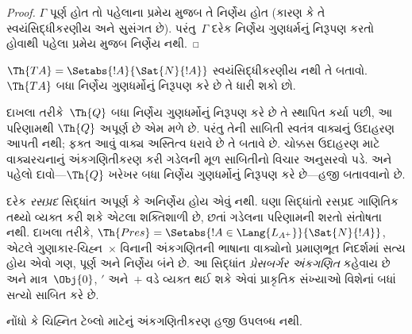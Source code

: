 \begin{proof}
$\Gamma$ પૂર્ણ હોત તો
પહેલાના પ્રમેય મુજબ તે નિર્ણેય
હોત (કારણ કે તે સ્વયંસિદ્ધીકરણીય
અને સુસંગત છે). પરંતુ~$\Gamma$
દરેક નિર્ણેય ગુણધર્મનું
નિરૂપણ કરતો હોવાથી પહેલા
પ્રમેય મુજબ નિર્ણેય નથી.
\end{proof}

\begin{prob}
$\Th{TA} = \Setabs{!A}{\Sat{N}{!A}}$
સ્વયંસિદ્ધીકરણીય નથી તે બતાવો.
$\Th{TA}$ બધા નિર્ણેય ગુણધર્મોનું
નિરૂપણ કરે છે તે ધારી શકો છો.
\end{prob}

દાખલા તરીકે~$\Th{Q}$ બધા
નિર્ણેય ગુણધર્મોનું નિરૂપણ
કરે છે તે સ્થાપિત કર્યા પછી, આ પરિણામથી
$\Th{Q}$ અપૂર્ણ છે એમ મળે છે. પરંતુ તેની
સાબિતી સ્વતંત્ર વાક્યનું ઉદાહરણ
આપતી નથી; ફક્ત આવું વાક્ય
અસ્તિત્વ ધરાવે છે તે બતાવે છે. ચોક્કસ
ઉદાહરણ માટે વાક્યરચનાનું અંકગણિતીકરણ
કરી ગડેલની મૂળ સાબિતીનો વિચાર અનુસરવો
પડે. અને પહેલો દાવો—$\Th{Q}$ ખરેખર
બધા નિર્ણેય ગુણધર્મોનું
નિરૂપણ કરે છે—હજી બતાવવાનો છે.

દરેક \emph{રસપ્રદ} સિદ્ધાંત અપૂર્ણ કે
અનિર્ણેય હોય એવું નથી. ઘણા સિદ્ધાંતો
રસપ્રદ ગાણિતિક તથ્યો વ્યક્ત કરી શકે
એટલા શક્તિશાળી છે, છતાં ગડેલના પરિણામની
શરતો સંતોષતા નથી. દાખલા તરીકે,
$\Th{Pres} = \Setabs{!A \in \Lang{L_{A^+}}}{\Sat{N}{!A}}$,
એટલે ગુણાકાર-ચિહ્ન~$\times$ વિનાની
અંકગણિતની ભાષાના વાક્યોનો
પ્રમાણભૂત નિદર્શમાં સત્ય હોય એવો ગણ,
પૂર્ણ અને નિર્ણેય બંને છે. આ સિદ્ધાંત
\emph{પ્રેસબર્ગર અંકગણિત} કહેવાય છે અને
માત્ર~$\Obj{0}$, $\prime$ અને~$+$ વડે
વ્યક્ત થઈ શકે એવાં પ્રાકૃતિક સંખ્યાઓ
વિશેનાં બધાં સત્યો સાબિત કરે છે.
\endgroup


\OLEndChapterHook
\endgroup


\begingroup
\makeatletter{}\makeatother

\label{guunit:OLP-0280}


\begin{editorial}
  નોંધો કે ચિહ્નિત ટેબ્લો માટેનું અંકગણિતીકરણ હજી ઉપલબ્ધ નથી.
\end{editorial}

\begingroup
\makeatletter{}\makeatother

\label{guunit:OLP-0281}


